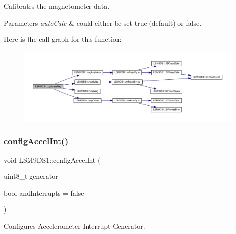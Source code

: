 Calibrates the magnetometer data. 


\begin{DoxyParams}{Parameters}
{\em auto\+Calc} & could either be set true (default) or false. \\
\hline
\end{DoxyParams}
Here is the call graph for this function\+:
\nopagebreak
\begin{figure}[H]
\begin{center}
\leavevmode
\includegraphics[width=350pt]{classLSM9DS1_afb45f0bcbcbeb15d4bd1a28821b24d14_cgraph}
\end{center}
\end{figure}
\mbox{\label{classLSM9DS1_a1e8ebc6c1e3876d8936197dc93f76717}} 
\subsubsection{\texorpdfstring{config\+Accel\+Int()}{configAccelInt()}}
{\footnotesize\ttfamily void L\+S\+M9\+D\+S1\+::config\+Accel\+Int (\begin{DoxyParamCaption}\item[{uint8\+\_\+t}]{generator,  }\item[{bool}]{and\+Interrupts = {\ttfamily false} }\end{DoxyParamCaption})}



Configures Accelerometer Interrupt Generator. 


